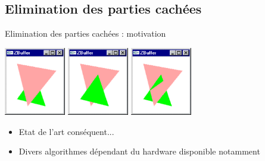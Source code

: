 \subsection{Elimination des parties cachées}

\begin{frame}[t]{Elimination des parties cachées : motivation}
  \begin{center}
    \includegraphics[height=3cm]{figs/peintre1.png}
    \hspace{1cm}
    \includegraphics[height=3cm]{figs/peintre2.png}
    \hspace{1cm}
    \includegraphics[height=3cm]{figs/peintre3.png}

  \end{center}
\begin{itemize}
  \item Etat de l'art conséquent...
  \item Divers algorithmes dépendant du hardware disponible notamment
\end{itemize}

\end{frame}

